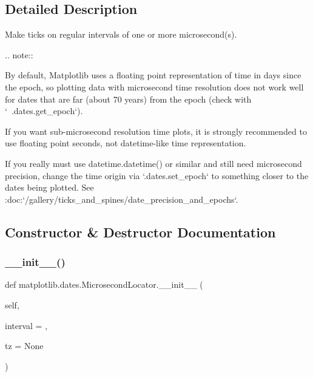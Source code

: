 \subsection{Detailed Description}
\begin{DoxyVerb}Make ticks on regular intervals of one or more microsecond(s).

.. note::

    By default, Matplotlib uses a floating point representation of time in
    days since the epoch, so plotting data with
    microsecond time resolution does not work well for
    dates that are far (about 70 years) from the epoch (check with
    `~.dates.get_epoch`).

    If you want sub-microsecond resolution time plots, it is strongly
    recommended to use floating point seconds, not datetime-like
    time representation.

    If you really must use datetime.datetime() or similar and still
    need microsecond precision, change the time origin via
    `.dates.set_epoch` to something closer to the dates being plotted.
    See :doc:`/gallery/ticks_and_spines/date_precision_and_epochs`.\end{DoxyVerb}
 

\subsection{Constructor \& Destructor Documentation}
\mbox{\label{classmatplotlib_1_1dates_1_1MicrosecondLocator_a8bd8bb6a6688e3e24062ddfc161f1f31}} 
\subsubsection{\texorpdfstring{\+\_\+\+\_\+init\+\_\+\+\_\+()}{\_\_init\_\_()}}
{\footnotesize\ttfamily def matplotlib.\+dates.\+Microsecond\+Locator.\+\_\+\+\_\+init\+\_\+\+\_\+ (\begin{DoxyParamCaption}\item[{}]{self,  }\item[{}]{interval = {},  }\item[{}]{tz = {\ttfamily None} }\end{DoxyParamCaption})}

